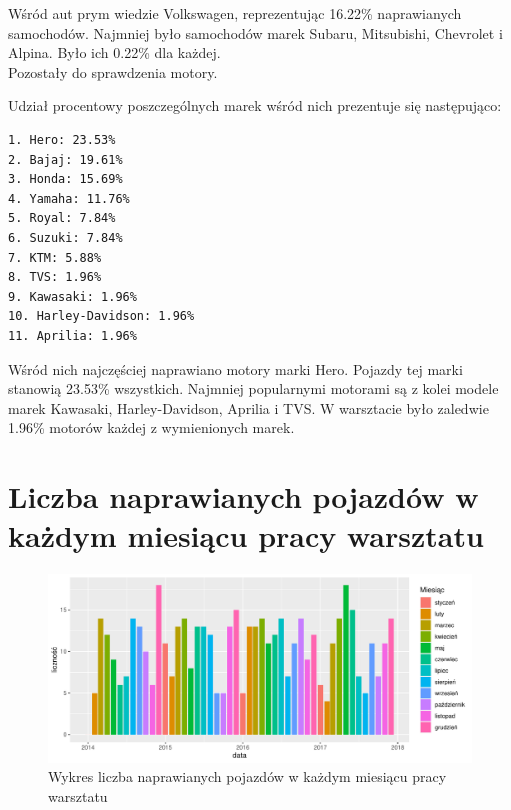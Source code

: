\documentclass{article}\usepackage[]{graphicx}\usepackage[]{xcolor}
\makeatletter
\def\maxwidth{ %
  \ifdim\Gin@nat@width>\linewidth
    \linewidth
  \else
    \Gin@nat@width
  \fi
}
\newenvironment{knitrout}{}{} %
\makeatother
\begin{document}
Wśród aut prym wiedzie Volkswagen, reprezentując  16.22\% naprawianych samochodów. Najmniej było samochodów marek Subaru, Mitsubishi, Chevrolet i Alpina. Było ich 0.22\% dla każdej. \\

Pozostały do sprawdzenia motory.



Udział procentowy poszczególnych marek wśród nich prezentuje się następująco:

\begin{verbatim}
1. Hero: 23.53%
2. Bajaj: 19.61%
3. Honda: 15.69%
4. Yamaha: 11.76%
5. Royal: 7.84%
6. Suzuki: 7.84%
7. KTM: 5.88%
8. TVS: 1.96%
9. Kawasaki: 1.96%
10. Harley-Davidson: 1.96%
11. Aprilia: 1.96%
\end{verbatim}

Wśród nich najczęściej naprawiano motory marki Hero. Pojazdy tej marki stanowią 23.53\% wszystkich. Najmniej popularnymi motorami są z kolei modele marek Kawasaki, Harley-Davidson, Aprilia i TVS. W warsztacie było zaledwie 1.96\% motorów każdej z wymienionych marek.

\section{Liczba naprawianych pojazdów w każdym miesiącu pracy warsztatu}

\begin{knitrout}
\color{fgcolor}\begin{figure}[H]

{\centering \includegraphics[width=\maxwidth]{figure/fig_naprawy_miesiecznie-1} 

}

\caption[Wykres liczba naprawianych pojazdów w każdym miesiącu pracy warsztatu]{Wykres liczba naprawianych pojazdów w każdym miesiącu pracy warsztatu}\label{fig:fig_naprawy_miesiecznie}
\end{figure}

\end{knitrout}
\end{document}
